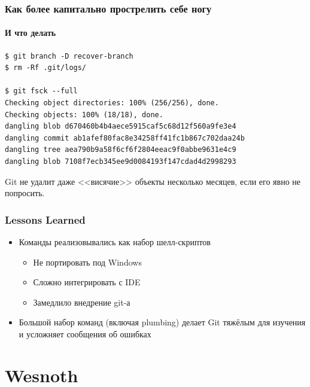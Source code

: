 \documentclass[xetex,mathserif,serif]{beamer}
\begin{document}
    \begin{frame}[fragile]
        \frametitle{Как более капитально прострелить себе ногу}
        \framesubtitle{И что делать}
        \begin{verbatim}
$ git branch -D recover-branch
$ rm -Rf .git/logs/

$ git fsck --full
Checking object directories: 100% (256/256), done.
Checking objects: 100% (18/18), done.
dangling blob d670460b4b4aece5915caf5c68d12f560a9fe3e4
dangling commit ab1afef80fac8e34258ff41fc1b867c702daa24b
dangling tree aea790b9a58f6cf6f2804eeac9f0abbe9631e4c9
dangling blob 7108f7ecb345ee9d0084193f147cdad4d2998293
        \end{verbatim}
        Git не удалит даже <<висячие>> объекты несколько месяцев, если его явно не попросить.
    \end{frame}

    \begin{frame}
        \frametitle{Lessons Learned}
        \begin{itemize}
            \item Команды реализовывались как набор шелл-скриптов
            \begin{itemize}
                \item Не портировать под Windows
                \item Сложно интегрировать с IDE
                \item Замедлило внедрение git-а
            \end{itemize}
            \item Большой набор команд (включая plumbing) делает Git тяжёлым для изучения и усложняет сообщения об ошибках
        \end{itemize}
    \end{frame}

    \section{Wesnoth}
\end{document}
